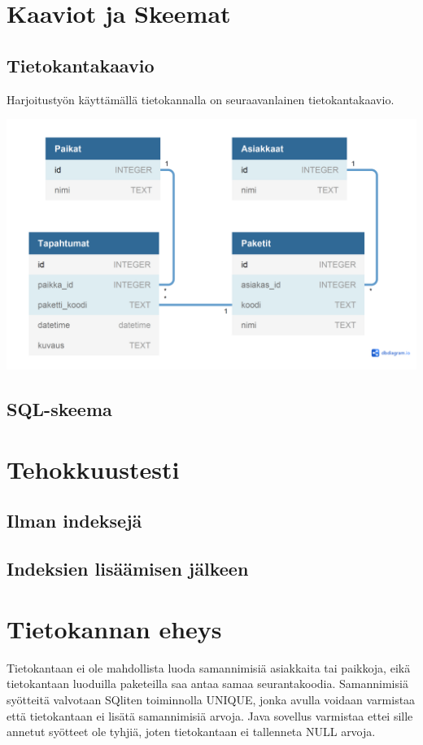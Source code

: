 \documentclass[12pt,a4paper]{article}
\begin{document}
\newpage
\section{Kaaviot ja Skeemat}
\subsection*{Tietokantakaavio}
Harjoitustyön käyttämällä tietokannalla on seuraavanlainen tietokantakaavio.
\begin{center}

\includegraphics[width=1\textwidth]{TikapeKaavio.png} 
\end{center}
\subsection*{SQL-skeema}

\newpage
\section{Tehokkuustesti}
\subsection*{Ilman indeksejä}
\subsection*{Indeksien lisäämisen jälkeen}

\newpage
\section{Tietokannan eheys}
Tietokantaan ei ole mahdollista luoda samannimisiä asiakkaita tai paikkoja, eikä tietokantaan luoduilla paketeilla saa antaa samaa seurantakoodia. Samannimisiä syötteitä valvotaan SQliten toiminnolla UNIQUE, jonka avulla voidaan varmistaa että tietokantaan ei lisätä samannimisiä arvoja. Java sovellus varmistaa ettei sille annetut syötteet ole tyhjiä, joten tietokantaan ei tallenneta NULL arvoja.
\end{document}
